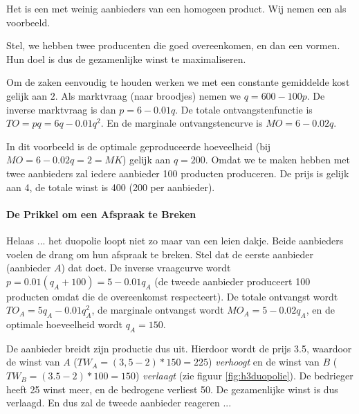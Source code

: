 Het  is een  met weinig aanbieders van een homogeen product. Wij nemen een  als voorbeeld.\\

\par Stel, we hebben twee producenten die goed overeenkomen, en dan een  vormen. Hun doel is dus de gezamenlijke winst te maximaliseren.
\par Om de zaken eenvoudig te houden werken we met een constante gemiddelde kost gelijk aan $2$. Als marktvraag (naar broodjes) nemen we $q=600-100p$. De inverse marktvraag is dan $p=6-0.01q$. De totale ontvangstenfunctie is $TO=pq=6q-0.01q^2$. En de marginale ontvangstencurve is $MO=6-0.02q$.\\

\par In dit voorbeeld is de optimale geproduceerde hoeveelheid (bij $MO=6-0.02q=2=MK$) gelijk aan $q=200$. Omdat we te maken hebben met twee aanbieders zal iedere aanbieder 100 producten produceren. De prijs is gelijk aan 4, de totale winst is 400 (200 per aanbieder).\\

\paragraph{De Prikkel om een Afspraak te Breken}

Helaas ... het duopolie loopt niet zo maar van een leien dakje. Beide aanbieders voelen de drang om hun afspraak te breken. Stel dat de eerste aanbieder (aanbieder $A$) dat doet. De inverse vraagcurve wordt $p=0.01(q_A+100)=5-0.01q_A$ (de tweede aanbieder produceert 100 producten omdat die de overeenkomst respecteert). De totale ontvangst wordt $TO_A=5q_A-0.01q_A^2$, de marginale ontvangst wordt $MO_A=5-0.02q_A$, en de optimale hoeveelheid wordt $q_A=150$. 
\par De aanbieder breidt zijn productie dus uit. Hierdoor wordt de prijs 3.5, waardoor de winst van $A$ ($TW_A=(3,5-2)*150=225$) \textit{verhoogt} en de winst van $B$ ($TW_B=(3.5-2)*100=150$) \textit{verlaagt} (zie figuur \ref{fig:h3duopolie}). De bedrieger heeft 25 winst meer, en de bedrogene verliest 50. De gezamenlijke winst is dus verlaagd. En dus zal de tweede aanbieder reageren ...

